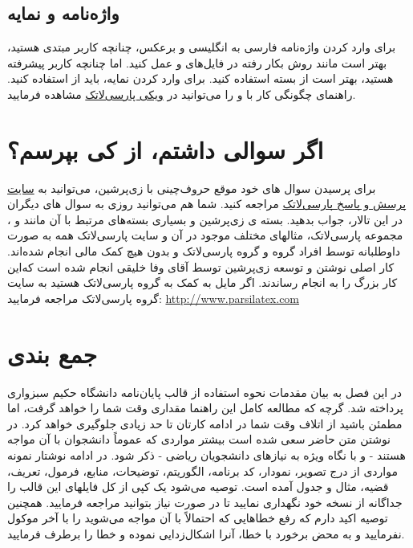 \subsection{واژه‌نامه و نمایه}
برای وارد کردن واژه‌نامه فارسی به انگلیسی و برعکس، چنانچه کاربر مبتدی هستید، بهتر است مانند روش بکار رفته در فایل‌های 
و
عمل کنید. اما چنانچه کاربر پیشرفته هستید، بهتر است از بسته
استفاده کنید. 
برای وارد کردن نمایه، باید از 
استفاده کنید. 
راهنمای چگونگی کار با 
 و  
را می‌توانید در
 \href{http://wiki.parsilatex.com}{ویکی پارسی‌لاتک} 
 مشاهده فرمایید.

\section{اگر سوالی داشتم، از کی بپرسم؟}
برای پرسیدن سوال های خود موقع حروف‌چینی با زی‌پرشین،  می‌توانید به
 \href{http://qa.parsilatex.com}{سایت پرسش و پاسخ پارسی‌لاتک}%
مراجعه کنید. شما هم می‌توانید روزی به سوال های دیگران در این تالار، جواب بدهید.
بسته ی زی‌پرشین و بسیاری بسته‌های مرتبط با آن مانند  و ، مجموعه پارسی‌لاتک، مثالهای مختلف موجود در آن و سایت پارسی‌لاتک همه به صورت داوطلبانه توسط افراد گروه 
و گروه پارسی‌لاتک و بدون هیچ کمک مالی انجام شده‌اند. کار اصلی نوشتن و توسعه زی‌پرشین توسط آقای وفا خلیقی انجام شده است که‌این کار بزرگ را به انجام رساندند.
اگر مایل به کمک به گروه پارسی‌لاتک هستید به سایت گروه پارسی‌لاتک مراجعه فرمایید:
 \href{http://www.parsilatex.com}{http://www.parsilatex.com} 
    
\section{جمع بندی}
در این فصل به بیان مقدمات نحوه استفاده از قالب پایان‌نامه دانشگاه حکیم سبزواری پرداخته شد. گرچه که مطالعه کامل این راهنما مقداری وقت شما را خواهد گرفت، اما مطمئن باشید از اتلاف وقت شما در ادامه کارتان تا حد زیادی جلوگیری خواهد کرد. در نوشتن متن حاضر سعی شده است بیشتر مواردی که عموماً دانشجوان با آن مواجه هستند - و با نگاه ویژه به نیازهای دانشجویان ریاضی - ذکر شود. در ادامه نوشتار نمونه مواردی از درج تصویر، نمودار، کد برنامه، الگوریتم، توضیحات، منابع، فرمول، تعریف، قضیه، مثال و جدول آمده است. توصیه می‌شود یک کپی از کل فایلهای این قالب را جداگانه از نسخه \پ خود نگهداری نمایید تا در صورت نیاز بتوانید مراجعه فرمایید. همچنین توصیه اکید دارم که رفع خطاهایی که احتمالاً با آن مواجه می‌شوید را با آخر موکول نفرمایید و به محض برخورد با خطا، آنرا اشکال‌زدایی نموده و خطا را برطرف فرمایید.

